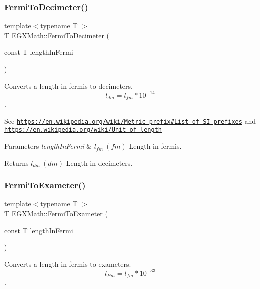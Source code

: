 \subsubsection{\texorpdfstring{Fermi\+To\+Decimeter()}{FermiToDecimeter()}}
{\footnotesize\ttfamily template$<$typename T $>$ \\
T E\+G\+X\+Math\+::\+Fermi\+To\+Decimeter (\begin{DoxyParamCaption}\item[{const T}]{length\+In\+Fermi }\end{DoxyParamCaption})}



Converts a length in fermis to decimeters. \[ l_{dm}=l_{fm} * 10^{-14} \]. 

See \href{https://en.wikipedia.org/wiki/Metric_prefix#List_of_SI_prefixes}{\tt https\+://en.\+wikipedia.\+org/wiki/\+Metric\+\_\+prefix\#\+List\+\_\+of\+\_\+\+S\+I\+\_\+prefixes} and \href{https://en.wikipedia.org/wiki/Unit_of_length}{\tt https\+://en.\+wikipedia.\+org/wiki/\+Unit\+\_\+of\+\_\+length} 
\begin{DoxyParams}{Parameters}
{\em length\+In\+Fermi} & $ l_{fm}\ (fm)$ Length in fermis. \\
\hline
\end{DoxyParams}
\begin{DoxyReturn}{Returns}
$ l_{dm}\ (dm)$ Length in decimeters. 
\end{DoxyReturn}
\mbox{\label{group___e_g_x_math-_conversions-_length_conversions-_non-_s_i-_fermi-_s_i_ga5070d7a2d963b8698fe00651db559941}} 
\subsubsection{\texorpdfstring{Fermi\+To\+Exameter()}{FermiToExameter()}}
{\footnotesize\ttfamily template$<$typename T $>$ \\
T E\+G\+X\+Math\+::\+Fermi\+To\+Exameter (\begin{DoxyParamCaption}\item[{const T}]{length\+In\+Fermi }\end{DoxyParamCaption})}



Converts a length in fermis to exameters. \[ l_{Em}=l_{fm} * 10^{-33} \]. 

